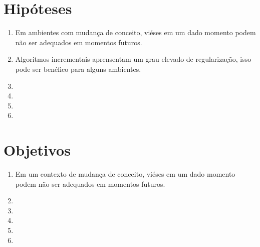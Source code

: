 \section{Hipóteses}

\begin{enumerate}
    \item Em ambientes com mudança de conceito, viéses em um dado momento
        podem não ser adequados em momentos futuros.
    \item Algoritmos incrementais aprensentam um grau elevado de regularização,
        isso pode ser benéfico para alguns ambientes.
    \item 
    \item 
    \item 
    \item 
\end{enumerate}

\section{Objetivos}

\begin{enumerate}
    \item Em um contexto de mudança de conceito, viéses em um dado momento
        podem não ser adequados em momentos futuros.
    \item 
    \item 
    \item 
    \item 
    \item 
\end{enumerate}
